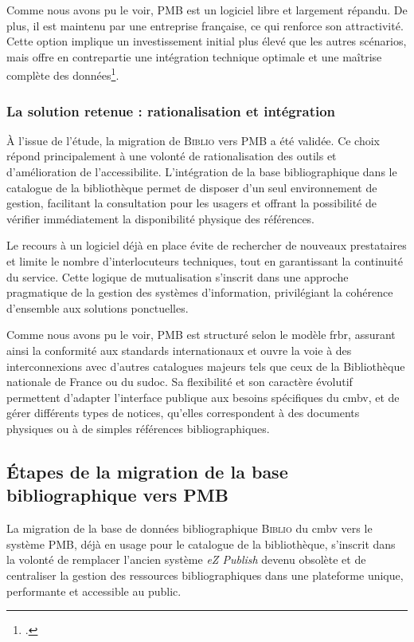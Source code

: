 Comme nous avons pu le voir, PMB est un logiciel libre et largement répandu. De plus, il est maintenu par une entreprise française, ce qui renforce son attractivité. Cette option implique un investissement initial plus élevé que les autres scénarios, mais offre en contrepartie une intégration technique optimale et une maîtrise complète des données\footcite{laurentguilloEtudeEvolutionBase2023}.

\subsubsection{La solution retenue : rationalisation et intégration}

À l'issue de l'étude, la migration de \textsc{Biblio} vers PMB a été validée. Ce choix répond principalement à une volonté de rationalisation des outils et d'amélioration de l'\gls{accessibilite}. L'intégration de la base bibliographique dans le catalogue de la bibliothèque permet de disposer d'un seul environnement de gestion, facilitant la consultation pour les usagers et offrant la possibilité de vérifier immédiatement la disponibilité physique des références.

Le recours à un logiciel déjà en place évite de rechercher de nouveaux prestataires et limite le nombre d'interlocuteurs techniques, tout en garantissant la continuité du service. Cette logique de mutualisation s'inscrit dans une approche pragmatique de la gestion des systèmes d'information, privilégiant la cohérence d'ensemble aux solutions ponctuelles.

Comme nous avons pu le voir, PMB est structuré selon le modèle \gls{frbr}, assurant ainsi la conformité aux standards internationaux et ouvre la voie à des interconnexions avec d'autres catalogues majeurs tels que ceux de la Bibliothèque nationale de France ou du \gls{sudoc}. Sa flexibilité et son caractère évolutif permettent d'adapter l'interface publique aux besoins spécifiques du \gls{cmbv}, et de gérer différents types de notices, qu'elles correspondent à des documents physiques ou à de simples références bibliographiques.

\subsection{Étapes de la migration de la base bibliographique vers PMB}

La migration de la base de données bibliographique \textsc{Biblio} du \gls{cmbv} vers le système \textsc{PMB}, déjà en usage pour le catalogue de la bibliothèque, s'inscrit dans la volonté de remplacer l'ancien système \textit{eZ Publish} devenu obsolète et de centraliser la gestion des ressources bibliographiques dans une plateforme unique, performante et accessible au public. 

